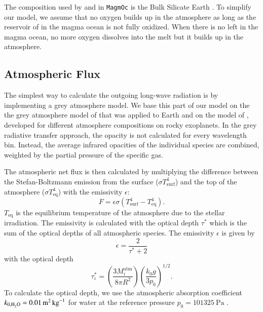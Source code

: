 \documentclass[oneside,twocolumn]{article}
\newcommand{\magmoc}{\texttt{\footnotesize{MagmOc}}}
\begin{document}
The composition used by \citet{Schaefer2016} and in \magmoc{} is the Bulk Silicate Earth \citep{ONeill1998}.
To simplify our model, we assume that no oxygen builds up in the atmosphere as long as the reservoir of  in the magma ocean is not fully oxidized.
When there is no  left in the magma ocean, no more oxygen dissolves into the melt but it builds up in the atmosphere.

\subsection{Atmospheric Flux}
\label{Sec_Flux}
The simplest way to calculate the outgoing long-wave radiation is by implementing a grey atmosphere model. We base this part of our model on the the grey atmosphere model of \citet{Elkins-Tanton2008} that was applied to Earth and on the model of \citet{Carone2014}, developed for different atmosphere compositions on rocky exoplanets. In the grey radiative transfer approach, the opacity is not calculated for every wavelength bin. Instead, the average infrared opacities of the individual species are combined, weighted by the partial pressure of the specific gas.

The atmospheric net flux is then calculated by multiplying the difference between the Stefan-Boltzmann emission from the surface ($\sigma T_\mathrm{surf}^4$) and the top of the atmosphere ($\sigma T_\mathrm{eq}^4$) with the emissivity \nolinebreak $\epsilon$:
\begin{equation}
\label{Eq_fluxgrey}
F = \epsilon \sigma ( T_\mathrm{surf}^4 - T_\mathrm{eq}^4 ).
\end{equation}
$T_\mathrm{eq}$ is the equilibrium temperature of the atmosphere due to the stellar irradiation.
The emissivity is calculated with the optical depth $\tau^*$ which is the sum of the optical depths of all atmospheric species.
The emissivity $\epsilon$ is given by
\begin{equation}
\epsilon = \frac{2}{\tau^* + 2}
\end{equation}
with the optical depth
\begin{equation}
\tau^*_i = \left( \frac{3 M_{i}^\mathrm{atm}}{8 \pi R^2} \right) \left( \frac{k_0 g}{3 p_0} \right)^{1/2}.
\end{equation}
To  calculate the optical depth, we use the atmospheric absorption coefficient $k_{0,\ce{H2O}} = \SI{0.01}{\metre\squared\per\kilogram}$ for water \citep{Elkins-Tanton2008} at the reference pressure $p_0 = \SI{101325}{\pascal}$ \citep{Yamamoto1952}.
\end{document}
